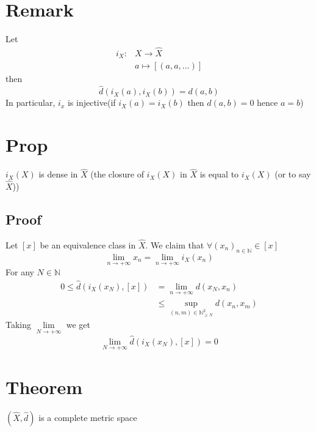 \documentclass{book}
\begin{document}
\section{Remark}
Let
$$\begin{aligned}
    i_X: &X\rightarrow \hat{X}\\
    & a\mapsto[(a,a,...)]
\end{aligned}$$
then $$\hat{d}(i_X(a),i_X(b))=d(a,b)$$
In particular, $i_x$ is injective(if $i_X(a)=i_X(b)$ then $d(a,b)=0$ hence $a=b$)
\section{Prop}
$i_X(X)$ is dense in $\hat{X}$ (the closure of $i_X(X)$ in $\hat{X}$ is equal to $i_X(X)$ (or to say $ \hat{X}$))
\subsection*{Proof}
Let $[x]$ be an equivalence class in $\hat{X}$. We claim that $\forall (x_n)_{n\in\mathbb{N}}\in [x]$ $$\lim\limits_{n\rightarrow+\infty}x_n=\lim\limits_{n\rightarrow+\infty}i_X(x_n)$$
For any $N\in \mathbb{N}$$$
\begin{aligned}
0\leq\hat{d}(i_X(x_N),[x]) &=\lim\limits_{n\rightarrow+\infty}d(x_N,x_n)\\
&\leq \sup\limits_{(n,m)\in\mathbb{N}_{\geq N}^2}d(x_n,x_m)
\end{aligned}$$
Taking $\lim\limits_{N\rightarrow+\infty}$ we get 
$$\lim\limits_{N\rightarrow+\infty}\hat{d}(i_X(x_N),[x])=0$$
\section{Theorem}$(\hat{X},\hat{d})$ is a complete metric space
\end{document}
